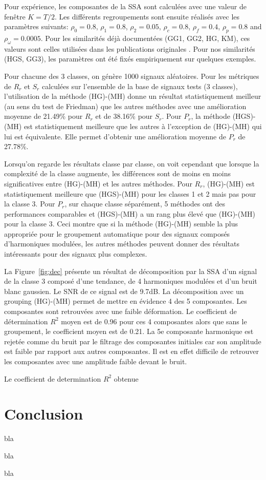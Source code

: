 \documentclass{gretsi}
\begin{document}
Pour expérience, les composantes de la SSA sont calculées avec une valeur de fenêtre $K=T/2$.
Les différents regroupements sont ensuite réalisés avec les paramètres suivants: $\rho_0=0.8$, $\rho_1=0.8$, $\rho_2=0.05$, $\rho_c=0.8$, $\rho_f=0.4$, $\rho_p=0.8$ and $\rho_\omega=0.0005$.
Pour les similarités déjà documentées (GG1, GG2, HG, KM), ces valeurs sont celles utilisées dans les publications originales \cite{abalov_14_auto, alvarez_13_auto}. Pour nos similarités (HGS, GG3), les paramètres ont été fixés empiriquement sur quelques exemples.



Pour chacune des 3 classes, on génère 1000 signaux aléatoires.
Pour les métriques de $R_r$ et $S_r$ calculées sur l'ensemble de la base de signaux tests (3 classes), l'utilisation de la méthode (HG)-(MH) donne un résultat statistiquement meilleur (au sens du test de Friedman) que les autres méthodes avec une amélioration moyenne de 21.49\% pour $R_r$ et de 38.16\% pour $S_r$.
Pour $P_r$, la méthode (HGS)-(MH) est statistiquement meilleure que les autres à l'exception de (HG)-(MH) qui lui est équivalente.
Elle permet d'obtenir une amélioration moyenne de $P_r$ de 27.78\%.


Lorsqu'on regarde les résultats classe par classe, on voit cependant que lorsque la complexité de la classe augmente, les différences sont de moins en moins significatives entre (HG)-(MH) et les autres méthodes.
Pour $R_r$, (HG)-(MH) est statistiquement meilleure que (HGS)-(MH) pour les classes 1 et 2 mais pas pour la classe 3.
Pour $P_r$, sur chaque classe séparément, 5 méthodes ont des performances comparables et (HGS)-(MH) a un rang plus élevé que (HG)-(MH) pour la classe 3.
Ceci montre que si la méthode (HG)-(MH) semble la plus appropriée pour le groupement automatique pour des signaux composés d'harmoniques modulées, les autres méthodes peuvent donner des résultats intéressants pour des signaux plus complexes.


La Figure~\ref{fig:dec} présente un résultat de décomposition par la SSA d'un signal de la classe 3 composé d'une tendance, de 4 harmoniques modulées et d'un bruit blanc gaussien. Le SNR de ce signal est de 9.7dB. La décomposition  avec un grouping (HG)-(MH) permet de mettre en évidence 4 des 5 composantes. Les composantes sont retrouvées avec une faible déformation. Le coefficient de détermination $R^2$ moyen est de 0.96 pour ces 4 composantes alors que sans le groupement, le coefficient moyen est de 0.21. La 5e composante harmonique est rejetée comme du bruit par le filtrage des composantes initiales car son amplitude est faible par rapport aux autres composantes. Il est en effet difficile de retrouver les composantes avec une amplitude faible devant le bruit.

Le coefficient de determination $R^2$ obtenue



\section{Conclusion}
\label{sec:ccl}
bla

bla

bla


 
\scriptsize
{}
\end{document}
